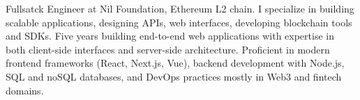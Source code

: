 

\begin{cvparagraph}

Fullsatck Engineer at Nil Foundation, Ethereum L2 chain.
I specialize in building scalable applications, designing APIs, web interfaces, developing blockchain tools and SDKs.
\newline
Five years building end-to-end web applications with expertise in both client-side interfaces and server-side architecture.
\newline
Proficient in modern frontend frameworks (React, Next.js, Vue), backend development with Node.js, SQL and noSQL databases, and DevOps practices
mostly in Web3 and fintech domains.
\end{cvparagraph}
